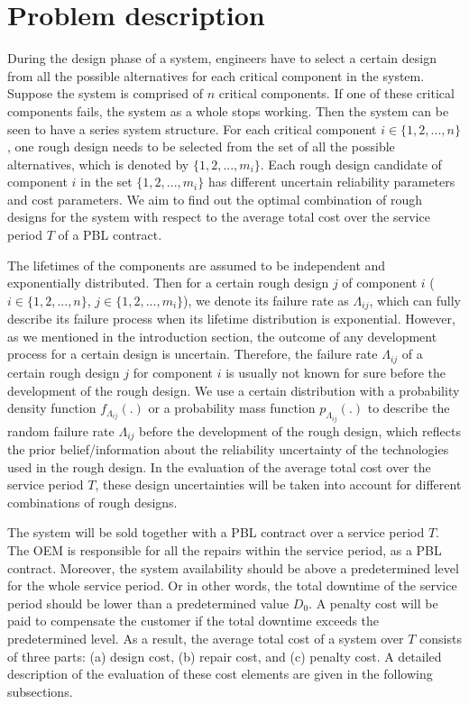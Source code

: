 \documentclass[preprint,12pt]{elsarticle}
\begin{document}
\section{Problem description}
During the design phase of a system, engineers have to select a certain design from all the possible alternatives for each critical component in the system. Suppose the system is comprised of $n$ critical components. If one of these critical components fails, the system as a whole stops working. Then the system can be seen to have a series system structure. For each critical component $i \in \{1,2,...,n\}$, one rough design needs to be selected from the set of all the possible alternatives, which is denoted by $\{1,2,...,m_i\}$. Each rough design candidate of component $i$ in the set $\{1,2,...,m_i\}$ has different uncertain reliability parameters and cost parameters. We aim to find out the optimal combination of rough designs for the system with respect to the average total cost over the service period $T$ of a PBL contract.

The lifetimes of the components are assumed to be independent and exponentially distributed. Then for a certain rough design $j$ of component $i$ ($i \in \{1,2,...,n\}$, $j \in \{1,2,...,m_i\}$), we denote its failure rate as $\Lambda_{ij}$, which can fully describe its failure process when its lifetime distribution is exponential. However, as we mentioned in the introduction section, the outcome of any development process for a certain design is uncertain. Therefore, the failure rate $\Lambda_{ij}$ of a certain rough design $j$ for component $i$ is usually not known for sure before the development of the rough design. We use a certain distribution with a probability density function $f_{\Lambda_{ij}}(.)$ or a probability mass function $p_{\Lambda_{ij}}(.)$ to describe the random failure rate $\Lambda_{ij}$ before the development of the rough design, which reflects the prior belief/information about the reliability uncertainty of the technologies used in the rough design. In the evaluation of the average total cost over the service period $T$, these design uncertainties will be taken into account for different combinations of rough designs.

The system will be sold together with a PBL contract over a service period $T$. The OEM is responsible for all the repairs within the service period, as a PBL contract. Moreover, the system availability should be above a predetermined level for the whole service period. Or in other words, the total downtime of the service period should be lower than a predetermined value $D_0$. A penalty cost will be paid to compensate the customer if the total downtime exceeds the predetermined level. As a result, the average total cost of a system over $T$ consists of three parts: (a) design cost, (b) repair cost, and (c) penalty cost. A detailed description of the evaluation of these cost elements are given in the following subsections.
\end{document}
